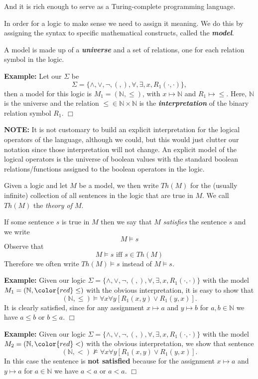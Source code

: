 \documentclass[a4paper,blends,pdf,colorBG,slideColor]{prosper}
\begin{document}
And it is rich enough to serve as a Turing-complete programming language.
\es

In order for a logic to make sense we need to assign it meaning.  We do this by assigning
the syntax to specific mathematical constructs, called the {\bf\em model}.

A model is made up of a {\bf\em universe} and a set of relations, one for each relation symbol
in the logic.

{\bf Example:} Let our $\Sigma$ be
\[
\Sigma = \{ \wedge, \vee, \neg, (, ), \forall, \exists, x, R_1(\cdot,\cdot) \},
\]
then a model for this logic is $M_1 = ({\mathbb N}, \le)$, with $x \mapsto {\mathbb N}$ and $R_1 \mapsto \le$.
Here, $\mathbb N$ is the universe and the relation $\le\in {\mathbb N} \times {\mathbb N}$ is the {\bf \em interpretation} of the binary relation symbol $R_1$. $\Box$

{\bf NOTE:}  It is not customary to build an explicit interpretation for the logical operators of the language,
although we could, but this would just clutter our notation since those interpretation will not change.
An explicit model of the logical operators is the universe of boolean values with the standard boolean relations/functions assigned to 
the boolean operators in the logic.

\es

Given a logic and let $M$ be a model, we then write $Th(M)$ for the (usually infinite) collection of all sentences in the logic that are true in $M$.  We call $Th(M)$ the {\em theory of $M$}.  

If some sentence $s$ is true in $M$ then we say that $M$ {\em satisfies} the sentence $s$ and we write
\[
M \models s
\]
Observe that
\[
M \models s \mbox{ iff } s \in Th(M)
\]
Therefore we often write $Th(M) \models s$ instead of $M\models s$.
\es

{\bf Example:} Given our logic $\Sigma = \{ \wedge, \vee, \neg, (, ), \forall, \exists, x, R_1(\cdot,\cdot) \}$
with the model $M_1 = ({\mathbb N}, {\color{red}\le})$ with the obvious interpretation, it is easy to show that
\[
({\mathbb N}, \le) \models \forall x \forall y[R_1(x,y) \vee R_1(y,x)].
\]
It is clearly satisfied, since for any assignment $x \mapsto a$ and $y \mapsto b$ for $a,b \in {\mathbb N}$
we have $a \le b \mbox{ or } b \le a$. $\Box$

{\bf Example:} Given our logic $\Sigma = \{ \wedge, \vee, \neg, (, ), \forall, \exists, x, R_1(\cdot,\cdot) \}$
with the model $M_2 = ({\mathbb N}, {\color{red}<})$ with the obvious interpretation, we show that
sentence
\[
({\mathbb N}, <) \not\models \forall x \forall y[R_1(x,y) \vee R_1(y,x)].
\]
In this case the sentence is {\bf not satisfied} because for the assignment $x \mapsto a$ and $y \mapsto a$ for $a \in {\mathbb N}$
we have $a < a \mbox{ or } a < a$. $\Box$
\es
\end{document}
